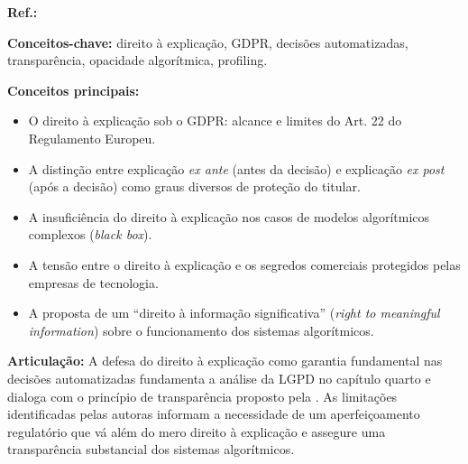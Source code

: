 \begin{fichamento}
    \textbf{Ref.:} \cite{Wachter2017TSP}
    
    \textbf{Conceitos-chave:} direito à explicação, GDPR, decisões automatizadas, transparência, opacidade algorítmica, profiling.
    
    \textbf{Conceitos principais:}
    \begin{itemize}
        \item O direito à explicação sob o GDPR: alcance e limites do Art. 22 do Regulamento Europeu.
        \item A distinção entre explicação \textit{ex ante} (antes da decisão) e explicação \textit{ex post} (após a decisão) como graus diversos de proteção do titular.
        \item A insuficiência do direito à explicação nos casos de modelos algorítmicos complexos (\textit{black box}).
        \item A tensão entre o direito à explicação e os segredos comerciais protegidos pelas empresas de tecnologia.
        \item A proposta de um ``direito à informação significativa'' (\textit{right to meaningful information}) sobre o funcionamento dos sistemas algorítmicos.
    \end{itemize}
    
    \textbf{Articulação:} A defesa do direito à explicação como garantia fundamental nas decisões automatizadas fundamenta a análise da LGPD no capítulo quarto e dialoga com o princípio de transparência proposto pela \MH{}. As limitações identificadas pelas autoras informam a necessidade de um aperfeiçoamento regulatório que vá além do mero direito à explicação e assegure uma transparência substancial dos sistemas algorítmicos.
\end{fichamento}

